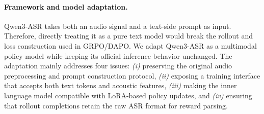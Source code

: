 \documentclass{article}
\begin{document}
\paragraph{Framework and model adaptation.}
Qwen3-ASR takes both an audio signal and a text-side prompt as input. Therefore,
directly treating it as a pure text model would break the rollout and loss
construction used in GRPO/DAPO. We adapt Qwen3-ASR as a multimodal policy model
while keeping its official inference behavior unchanged. The adaptation mainly
addresses four issues: \textit{(i)} preserving the original audio preprocessing
and prompt construction protocol, \textit{(ii)} exposing a training interface that
accepts both text tokens and acoustic features, \textit{(iii)} making the inner
language model compatible with LoRA-based policy updates, and \textit{(iv)}
ensuring that rollout completions retain the raw ASR format for reward parsing.
\end{document}
